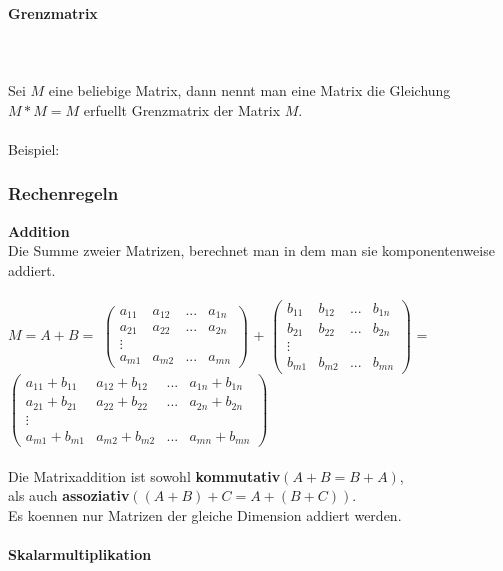 \documentclass[a4paper]{article} %
\begin{document}
	\paragraph{Grenzmatrix}
	 \hspace{0 cm} \\ \noindent \\
	Sei $M$ eine beliebige Matrix, dann nennt man eine Matrix die Gleichung $M * M = M$ erfuellt Grenzmatrix der Matrix $M$.
	\\\\
	Beispiel:
	\newpage
	\subsubsection{Rechenregeln}
	\textbf{Addition}\\
	Die Summe zweier Matrizen, berechnet man in dem man sie komponentenweise addiert.\\\\
	\small
	$M = A + B = $ 	
	$
	\begin{pmatrix}
		a_{11} & a_{12} & ... 	& a_{1n}\\
		a_{21} & a_{22} & ...	& a_{2n}\\
		\vdots &        &	    &\\
		a_{m1} & a_{m2} & ...	& a_{mn}
	\end{pmatrix}
	$
	+
	$
	\begin{pmatrix}
	b_{11} & b_{12} & ... 	& b_{1n}\\
	b_{21} & b_{22} & ...	& b_{2n}\\
	\vdots &        &	    &\\
	b_{m1} & b_{m2} & ...	& b_{mn}
	\end{pmatrix}
	$
	=
	$
	\begin{pmatrix}
	a_{11}+b_{11} & a_{12}+b_{12} & ...    & a_{1n}+b_{1n}\\
	a_{21}+b_{21} & a_{22}+b_{22}  & ...	   & a_{2n}+ b_{2n}\\
	\vdots        &               &	       &\\
	a_{m1}+b_{m1} & a_{m2}+b_{m2} & ...	   & a_{mn}+ b_{mn}
	\end{pmatrix}
	$\\
	\\
	Die Matrixaddition ist sowohl \textbf{kommutativ}$(A+B=B+A)$,\\ als auch \textbf{assoziativ}$( (A+B)+C = A +(B+C))$.\\
	Es koennen nur Matrizen der gleiche Dimension addiert werden.\\\\
	\textbf{Skalarmultiplikation}\\
	
\end{document}
